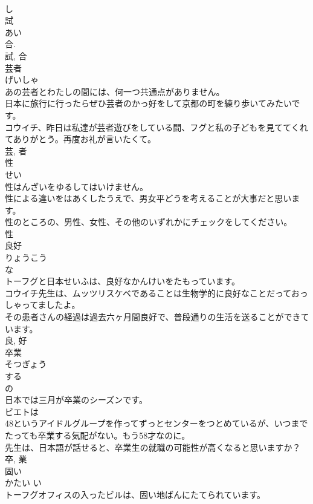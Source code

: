 \documentclass[8pt]{extreport}
\begin{document}
\begin{CJK}{UTF8}{min}
\\	し 
\\	試 
\\	あい 
\\	合. 
\\	試, 合	
\\	芸者	
\\	げいしゃ	
\\	あの芸者とわたしの間には、何一つ共通点がありません。	
\\	日本に旅行に行ったらぜひ芸者のかっ好をして京都の町を練り歩いてみたいです。	
\\	コウイチ、昨日は私達が芸者遊びをしている間、フグと私の子どもを見ててくれてありがとう。再度お礼が言いたくて。	
\\	芸, 者	
\\	性	
\\	せい	
\\	性はんざいをゆるしてはいけません。	
\\	性による違いをはあくしたうえで、男女平どうを考えることが大事だと思います。	
\\	性のところの、男性、女性、その他のいずれかにチェックをしてください。	
\\	性	
\\	良好	
\\	りょうこう	
\\	な 
\\	トーフグと日本せいふは、良好なかんけいをたもっています。	
\\	コウイチ先生は、ムッツリスケベであることは生物学的に良好なことだっておっしゃってましたよ。	
\\	その患者さんの経過は過去六ヶ月間良好で、普段通りの生活を送ることができています。	
\\	良, 好	
\\	卒業	
\\	そつぎょう	
\\	する 
\\	の 
\\	日本では三月が卒業のシーズンです。	
\\	ビエトは
\\	48というアイドルグループを作ってずっとセンターをつとめているが、いつまでたっても卒業する気配がない。もう58才なのに。	
\\	先生は、日本語が話せると、卒業生の就職の可能性が高くなると思いますか？	
\\	卒, 業	
\\	固い	
\\	かたい	い 
\\	トーフグオフィスの入ったビルは、固い地ばんにたてられています。	

\end{CJK}
\end{document}
